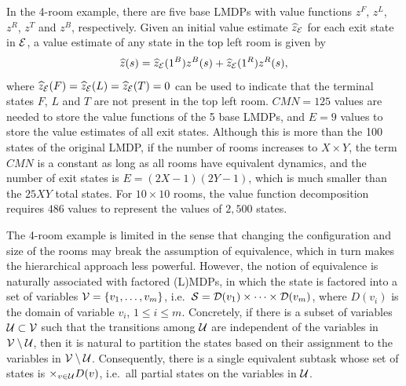 \begin{example}[Example 1] %
In the 4-room example, there are five base LMDPs with value functions $z^F$, $z^L$, $z^R$, $z^T$ and $z^B$, respectively. Given an initial value estimate $\widehat{z}_{\mathcal{E}}$ for each exit state in $\mathcal{E}$, a value estimate of any state in the top left room is given by \[\linebreak\widehat{z}(s)=\widehat{z}_\cE(1^B) z^B(s) + \widehat{z}_\cE(1^R) z^R(s),\] where $\widehat{z}_{\mathcal{E}}(F)=\widehat{z}_{\mathcal{E}}(L)=\widehat{z}_{\mathcal{E}}(T)=0$ can be used to indicate that the terminal states $F$, $L$ and $T$ are not present in the top left room. $CMN = 125$ values are needed to store the value functions of the 5 base LMDPs, and $E=9$ values to store the value estimates of all exit states. Although this is more than the 100 states of the original LMDP, if the number of rooms increases to $X\times Y$, the term $CMN$ is a constant as long as all rooms have equivalent dynamics, and the number of exit states is $E=(2X-1)(2Y-1)$, which is much smaller than the $25 XY$ total states. For $10\times 10$ rooms, the value function decomposition requires $486$ values to represent the values of $2{,}500$ states.
\end{example}

The 4-room example is limited in the sense that changing the configuration and size of the rooms may break the assumption of equivalence, which in turn makes the hierarchical approach less powerful. However, the notion of equivalence is naturally associated with factored (L)MDPs, in which the state is factored into a set of variables $\mathcal{V}=\{v_1,\ldots,v_m\}$, i.e.~$\mathcal{S}=\mathcal{D}(v_1)\times\cdots\times\mathcal{D}(v_m)$, where $D(v_i)$ is the domain of variable $v_i$, $1\leq i\leq m$.
Concretely, if there is a subset of variables $\mathcal{U}\subset\mathcal{V}$ such that the transitions among $\mathcal{U}$ are independent of the variables in $\mathcal{V}\setminus\mathcal{U}$, then it is natural to partition the states based on their assignment to the variables in $\mathcal{V}\setminus\mathcal{U}$. Consequently, there is a single equivalent subtask whose set of states is $\times_{v\in\mathcal{U}}D(v)$, i.e.~all partial states on the variables in $\mathcal{U}$.


